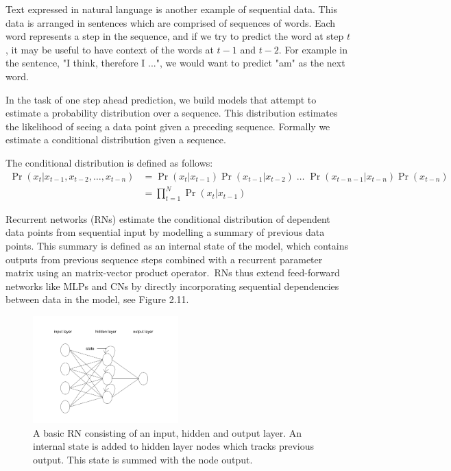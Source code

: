 \noindent Text expressed in natural language is another example of sequential data. This data is arranged in sentences which are comprised of sequences of words. Each word represents a step in the sequence, and if we try to predict the word at step $ t $, it may be useful to have context of the words at $t -1$ and $t - 2$. For example in the sentence, "I think, therefore I ...", we would want to predict "am" as the next word. \par

\noindent In the task of one step ahead prediction, we build models that attempt to estimate a probability distribution over a sequence. This distribution estimates the likelihood of seeing a data point given a preceding sequence. Formally we estimate a conditional distribution given a sequence. \par 

\noindent The conditional distribution is defined as follows:
\begin{equation}
	\begin{split}
		\Pr( x_t | x_{t - 1},  x_{t - 2}, \dots,  x_{t - n} ) & = \Pr(x_t | x_{t - 1}) \Pr(x_{t - 1}| x_{t - 2}) \; \dots \; \Pr(x_{t - n - 1}| x_{t - n}) \Pr(x_{t-n}) \\
		& = \prod_{t=1}^N \Pr(x_t | x_{t - 1})
	\end{split}
\end{equation}

\noindent Recurrent networks (RNs) estimate the conditional distribution of dependent data points from sequential input by modelling a summary of previous data points. This summary is defined as an internal state of the model, which contains outputs from previous sequence steps combined with a recurrent parameter matrix using an matrix-vector product operator.\ RNs thus extend feed-forward networks like MLPs and CNs by directly incorporating sequential dependencies between data in the model, see Figure 2.11. \par

\begin{figure}[H]
   	\centering
    	\includegraphics[width=0.5\textwidth, height=0.3\textwidth]{recurrent_network}
	\captionsetup{justification=centering}
	\caption{A basic RN consisting of an input, hidden and output layer. An internal state is added to hidden layer nodes which tracks previous output. This state is summed with the node output.}
\end{figure}

